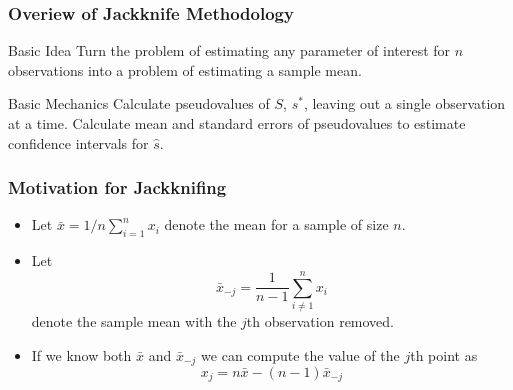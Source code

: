 \documentclass{beamer}
\begin{document}
\begin{frame}
  \frametitle{Overiew of Jackknife Methodology}

\begin{block}{Basic Idea}
Turn the problem of estimating any parameter of interest for $n$ observations into a problem of estimating a sample mean.
\end{block}

\begin{block}{Basic Mechanics}
Calculate pseudovalues of $S$, $s^*$, leaving out a single observation at a time. Calculate mean and standard errors of pseudovalues to estimate confidence intervals for $\widehat{s}$.

\end{block}




\end{frame}

\begin{frame}
  \frametitle{Motivation for Jackknifing}

\begin{itemize}
    \item Let $\bar{x} = 1/n \sum_{i=1}^{n}x_i$ denote the mean for a sample of size $n$.

    \item Let 
\[
\bar{x}_{-j} = \frac{1}{n-1} \sum_{i \neq 1}^{n}x_i
\]
denote the sample mean with the $j$th observation removed.

    \item If we know both $\bar{x}$ and $\bar{x}_{-j}$ we can compute the value of the $j$th point as
\[
x_j = n\bar{x} - (n-1)\bar{x}_{-j}
\]


\end{itemize}

\end{frame}
\end{document}

